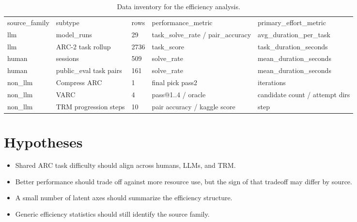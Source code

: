 \documentclass[11pt]{article}
\begin{document}
\begin{table}[htbp]
\centering
\caption{Data inventory for the efficiency analysis.}
\label{tab:inventory}
\begin{tabular}{lllll}
\toprule
source\_family & subtype & rows & performance\_metric & primary\_effort\_metric \\
llm & model\_runs & 29 & task\_solve\_rate / pair\_accuracy & avg\_duration\_per\_task \\
llm & ARC-2 task rollup & 2736 & task\_score & task\_duration\_seconds \\
human & sessions & 509 & solve\_rate & mean\_duration\_seconds \\
human & public\_eval task pairs & 161 & solve\_rate & mean\_duration\_seconds \\
non\_llm & Compress ARC & 1 & final pick pass2 & iterations \\
non\_llm & VARC & 4 & pass@1..4 / oracle & candidate count / attempt dirs \\
non\_llm & TRM progression steps & 10 & pair accuracy / kaggle score & step \\
\bottomrule
\end{tabular}
\end{table}
\section{Hypotheses}
\begin{itemize}
\item Shared ARC task difficulty should align across humans, LLMs, and TRM.
\item Better performance should trade off against more resource use, but the sign of that tradeoff may differ by source.
\item A small number of latent axes should summarize the efficiency structure.
\item Generic efficiency statistics should still identify the source family.
\end{itemize}
\end{document}
